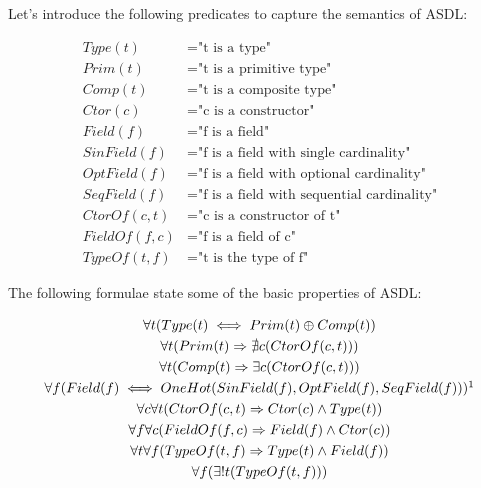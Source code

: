 \documentclass[12pt]{article}
\begin{document}
\noindent
Let's introduce the following predicates to capture the semantics of ASDL:

\begingroup
\allowdisplaybreaks
\vspace{-.5cm}
\begin{align*}
Type(t) &= \text{"t is a type"} \\
Prim(t) &= \text{"t is a primitive type"} \\
Comp(t) &= \text{"t is a composite type"} \\
Ctor(c) &= \text{"c is a constructor"} \\
Field(f) &= \text{"f is a field"} \\
SinField(f) &= \text{"f is a field with single cardinality"} \\
OptField(f) &= \text{"f is a field with optional cardinality"} \\
SeqField(f) &= \text{"f is a field with sequential cardinality"} \\
CtorOf(c, t) &= \text{"c is a constructor of t"} \\
FieldOf(f, c) &= \text{"f is a field of c"} \\
TypeOf(t, f) &= \text{"t is the type of f"}
\end{align*}
\endgroup

\noindent
The following formulae state some of the basic properties of ASDL:

\begingroup
\allowdisplaybreaks
\vspace{-.5cm}
\begin{gather*}
\forall t(Type(t) \iff Prim(t) \oplus Comp(t)) \\
\forall t(Prim(t) \Rightarrow \nexists c(CtorOf(c, t))) \\
\forall t(Comp(t) \Rightarrow \exists c(CtorOf(c, t))) \\
\forall f(Field(f) \iff OneHot(SinField(f), OptField(f), SeqField(f))) \footnotemark \\
\forall c \forall t(CtorOf(c, t) \Rightarrow Ctor(c) \land Type(t)) \\
\forall f \forall c(FieldOf(f, c) \Rightarrow Field(f) \land Ctor(c)) \\
\forall t \forall f(TypeOf(t, f) \Rightarrow Type(t) \land Field(f)) \\
\forall f(\exists! t(TypeOf(t, f)))
\end{gather*}
\endgroup

\end{document}
